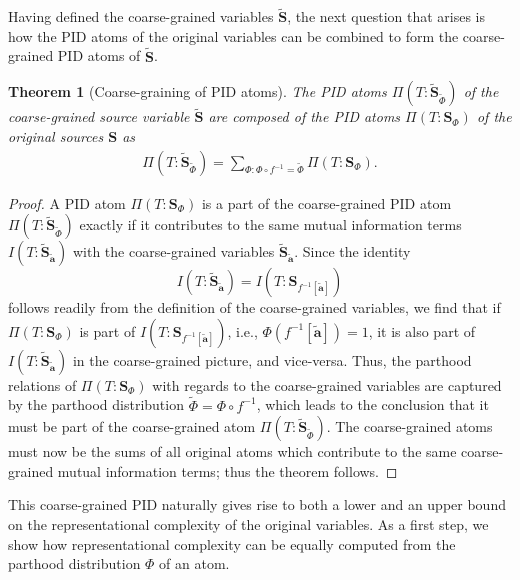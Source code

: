 \documentclass[10pt]{article}
\theoremstyle{definition}
\theoremstyle{plain}
\newtheorem{theorem}{Theorem}[section]
\begin{document}
Having defined the coarse-grained variables $\bm{\tilde{S}}$, the next question that arises is how the PID atoms of the original variables can be combined to form the coarse-grained PID atoms of $\bm{\tilde{S}}$.

\begin{theorem}[Coarse-graining of PID atoms]\label{thm:coarse-graining-of-pid-atoms}
The PID atoms $\Pi(T: \bm{\tilde{S}}_{\tilde{\Phi}})$ of the coarse-grained source variable $\bm{\tilde{S}}$ are composed of the PID atoms $\Pi(T: \bm{S}_\Phi)$ of the original sources $\bm S$ as
\begin{align}\label{eq:atoms-in-coarsed-atoms}
    \Pi\left(T:\bm{\tilde{S}}_ {\tilde{\Phi}}\right) = \sum_{\Phi:\Phi\circ f^{-1} = \tilde{\Phi}} \Pi\left(T:\bm{S}_ {\Phi}\right).
\end{align}
\end{theorem}
\begin{proof}

A PID atom $\Pi\left(T:\bm{S}_\Phi\right)$ is a part of the coarse-grained PID atom $\Pi\left(T:\bm{\tilde{S}}_{\tilde{\Phi}}\right)$ exactly if it contributes to the same mutual information terms $I\left(T:\bm{\tilde{S}}_{\bm{\tilde{a}}}\right)$ with the coarse-grained variables $\bm{\tilde{S}}_{\bm{\tilde{a}}}$. Since the identity
\begin{equation*}
    I\left(T:\bm{\tilde{S}}_{\bm{\tilde{a}}}\right) = I\left(T:\bm{S}_{f^{-1}[\bm{\tilde{a}}]}\right)
\end{equation*}
follows readily from the definition of the coarse-grained variables, we find that if $\Pi\left(T:\bm{S}_\Phi\right)$ is part of $I\left(T:\bm{S}_{f^{-1}[\bm{\tilde{a}}]}\right)$, i.e., $\Phi(f^{-1}[\bm{\tilde{a}}]) = 1$, it is also part of $I\left(T:\bm{\tilde{S}}_{\bm{\tilde{a}}}\right)$ in the coarse-grained picture, and vice-versa. Thus, the parthood relations of $\Pi\left(T:\bm{S}_\Phi\right)$ with regards to the coarse-grained variables are captured by the parthood distribution $\tilde{\Phi} = \Phi \circ f^{-1}$, which leads to the conclusion that it must be part of the coarse-grained atom $\Pi\left(T:\bm{\tilde{S}}_{\tilde{\Phi}}\right)$. The coarse-grained atoms must now be the sums of all original atoms which contribute to the same coarse-grained mutual information terms; thus the theorem follows.

\end{proof}

This coarse-grained PID naturally gives rise to both a lower and an upper bound on the representational complexity of the original variables. As a first step, we show how representational complexity can be equally computed from the parthood distribution $\Phi$ of an atom.
\end{document}
